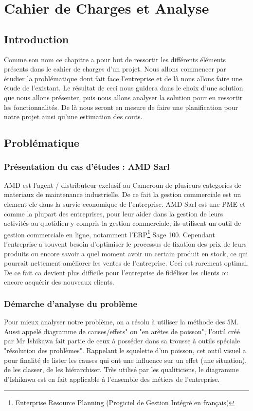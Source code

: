 \chapter{Cahier de Charges et Analyse}

\section*{Introduction}%
%
Comme son nom ce chapitre a pour but de ressortir les différents éléments présents dans le cahier de charges d’un projet. Nous allons commencer par étudier la problématique dont fait face l’entreprise et de là nous allons faire une étude de l’existant. Le résultat de ceci nous guidera dans le choix d’une solution que nous allons présenter, puis nous allons analyser la solution pour en ressortir les fonctionnalités. De là nous seront en mesure de faire une planification pour notre projet ainsi qu’une estimation des couts.
\section{Problématique}
\subsection{Présentation du cas d’études : AMD Sarl}
AMD est l'agent / distributeur exclusif au Cameroun de plusieurs categories de materiaux de maintenance industrielle. De ce fait la gestion commerciale est un element cle dans la survie economique de l'entreprise. AMD Sarl est une PME et comme la plupart des entreprises, pour leur aider dans la gestion de leurs activités au quotidien y compris la gestion commerciale, ils utilisent un outil de gestion commerciale en ligne, notamment l’ERP\footnote{Enterprise Resource Planning (Progiciel de Gestion Intégré en français)} Sage 100.
Cependant l'entreprise a souvent besoin d'optimiser le processus de fixation des prix de leurs produits ou encore savoir a quel moment avoir un certain produit en stock, ce qui pourrait nettement améliorer les ventes de l'entreprise. Ceci est rarement optimal. De ce fait ca devient plus difficile pour l'entreprise de fidéliser les clients ou encore acquérir des nouveaux clients. 
\subsection{Démarche d’analyse du problème}
Pour mieux analyser notre problème, on a résolu à utiliser la méthode des 5M. Aussi appelé diagramme de causes/effets" ou "en arêtes de poisson", l'outil créé par Mr Ishikawa fait partie de ceux à posséder dans sa trousse à outils spéciale "résolution des problèmes". Rappelant le squelette d'un poisson, cet outil visuel a pour finalité de lister les causes qui ont une influence sur un effet (une situation), de les classer, de les hiérarchiser. Très utilisé par les qualiticiens, le diagramme d'Ishikawa est en fait applicable à l'ensemble des métiers de l'entreprise.

